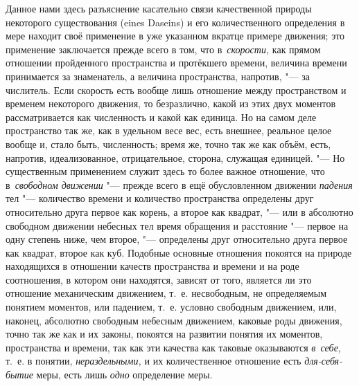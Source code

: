 Данное нами здесь разъяснение касательно связи качественной природы некоторого
существования (eines Daseins) и его количественного определения в мере находит
своё применение в уже указанном вкратце примере движения; это применение
заключается прежде всего в том, что в~{\em скорости,} как прямом отношении
пройденного пространства и протёкшего времени, величина времени принимается за
знаменатель, а величина пространства, напротив, "--- за числитель. Если
скорость есть вообще лишь отношение между пространством и временем некоторого
движения, то безразлично, какой из этих двух моментов рассматривается как
численность и какой как единица. Но на самом деле пространство так же, как в
удельном весе вес, есть внешнее, реальное целое вообще и, стало быть,
численность; время же, точно так же как объём, есть, напротив, идеализованное,
отрицательное, сторона, служащая единицей. "--- Но существенным применением
служит здесь то более важное отношение, что в~{\em свободном движении} "---
прежде всего в ещё обусловленном движении {\em падения} тел "--- количество
времени и количество пространства определены друг относительно друга первое как
корень, а второе как квадрат, "--- или в абсолютно свободном движении небесных
тел время обращения и расстояние "--- первое на одну степень ниже, чем второе,
"--- определены друг относительно друга первое как квадрат, второе как куб.
Подобные основные отношения покоятся на природе находящихся в отношении качеств
пространства и времени и на роде соотношения, в котором они находятся, зависят
от того, является ли это отношение механическим движением, т.~е. несвободным,
не определяемым понятием моментов, или падением, т.~е. условно свободным
движением, или, наконец, абсолютно свободным небесным движением, каковые роды
движения, точно так же как и их законы, покоятся на развитии понятия их
моментов, пространства и времени, так как эти качества как таковые оказываются
{\em в~себе,} т.~е. в понятии, {\em нераздельными,} и их количественное
отношение есть {\em для-себя-бытие} меры, есть лишь {\em одно} определение
меры.

